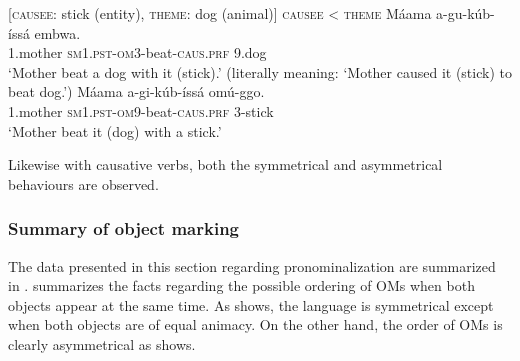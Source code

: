 \documentclass[output=paper,
            colorlinks, citecolor=brown
            ,draftmode
		  ]{langscibook}
\begin{document}
\ea%
    \label{ex:yoneda:40}
    [\textsc{causee}: stick (entity), \textsc{theme}: dog (animal)]  \textsc{causee} < \textsc{theme}
    \ea\label{ex:yoneda:40a}\gll Máama    a-gu-kúb-íssá                       embwa. \\
         1.mother    \textsc{sm1.pst-om3}-beat-\textsc{caus.prf}    9.dog \\
    \glt ‘Mother beat a dog with it (stick).’ 
        (literally meaning: ‘Mother caused it (stick) to beat dog.’)  
    \ex\label{ex:yoneda:40b}\gll Máama     a-gi-kúb-íssá                     omú-ggo.\\
    1.mother    \textsc{sm1.pst-om9}-beat-\textsc{caus.prf}     3-stick\\
    \glt ‘Mother beat it (dog) with a stick.’
    \z
\z
        

\ea%
    \label{ex:yoneda:41}
    \z
\z



    Likewise with causative verbs, both the symmetrical and asymmetrical behaviours are observed. 



\subsubsection{Summary of object marking}
\label{sec:yoneda:3.3.4}


The data presented in this section regarding pronominalization are summarized in .  summarizes the facts regarding the possible ordering of OMs when both objects appear at the same time. As  shows, the language is symmetrical except when both objects are of equal animacy. On the other hand, the order of OMs is clearly asymmetrical as  shows.  
\end{document}
